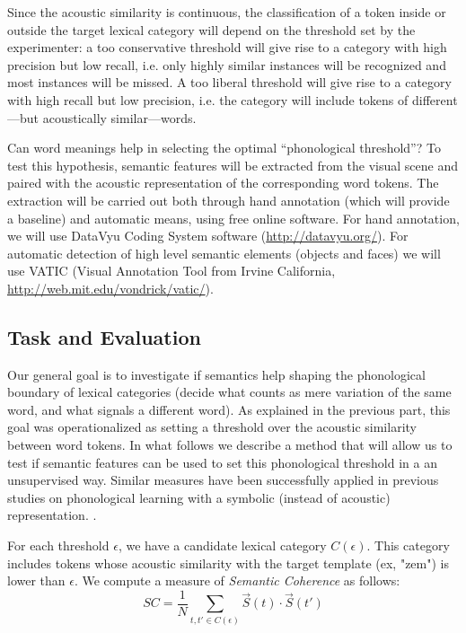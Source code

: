 \documentclass[12pt]{article}
\begin{document}
Since the acoustic similarity is continuous, the classification of a token inside or outside the target lexical category will depend on the threshold set by the experimenter: a too conservative threshold will give rise to a category with high precision but low recall, i.e. only highly similar instances will be recognized and most instances will be missed. A too liberal threshold will give rise to a category with high recall but low precision, i.e. the category will include tokens of different---but acoustically similar---words.

Can word meanings help in selecting the optimal ``phonological threshold''? To test this hypothesis, semantic features will be extracted from the visual scene and paired with the acoustic representation of the corresponding word tokens. The extraction will be carried out both through hand annotation (which will provide a baseline) and automatic means, using free online software. For hand annotation, we will use DataVyu Coding System software (\url{http://datavyu.org/}). For automatic detection of high level semantic elements (objects and faces) we will use VATIC (Visual Annotation Tool from Irvine California, \url{http://web.mit.edu/vondrick/vatic/}). 

\subsection{Task and Evaluation}

Our general goal is to investigate if semantics help shaping the phonological boundary of lexical categories (decide what counts as mere variation of the same word, and what signals a different word). As explained in the previous part, this goal was operationalized as setting a threshold over the acoustic similarity between word tokens. In what follows we describe a method that will allow us to test if semantic features can be used to set this phonological threshold in a an unsupervised way. Similar measures have been successfully applied in previous studies on phonological learning with a symbolic (instead of acoustic) representation. \cite{fourtassi2014a, fourtassi2014b}.

For each threshold $\epsilon$,  we have a candidate lexical category $C(\epsilon)$. This category includes tokens whose acoustic similarity with the target template (ex, "zem") is lower than $\epsilon$. We compute a measure of \textit{Semantic Coherence} as follows:
$$
SC = \frac{1}{N} \sum_{t,t' \in C( \epsilon ) } {\vec{S}(t) \cdot \vec{S}(t')}
$$
\end{document}
